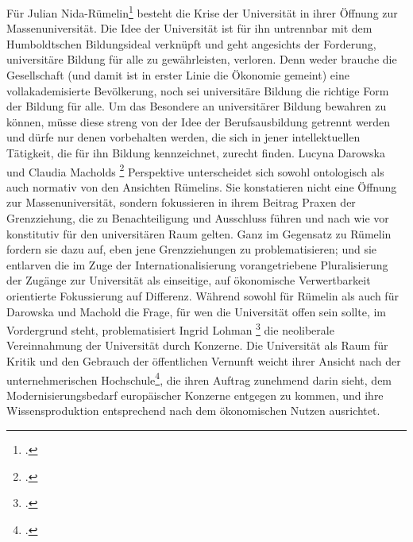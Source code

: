   Für Julian Nida-Rümelin\footnotemark \footcitetext{nida} besteht die Krise
  der Universität in ihrer Öffnung zur Massenuniversität. Die Idee der
  Universität ist für ihn untrennbar mit dem \glqq Humboldtschen Bildungsideal\grqq\footnotemark {} verknüpft und geht angesichts der
Forderung, universitäre Bildung für alle zu gewährleisten, verloren. Denn weder
brauche die Gesellschaft (und damit ist in erster Linie die Ökonomie gemeint)
eine vollakademisierte Bevölkerung, noch sei universitäre Bildung die richtige
Form der Bildung für alle. Um das Besondere an universitärer Bildung bewahren
zu können, müsse diese streng von der Idee der Berufsausbildung getrennt werden
und dürfe nur denen vorbehalten werden, die sich in jener intellektuellen
Tätigkeit, die für ihn Bildung kennzeichnet, zurecht finden. Lucyna Darowska
und Claudia Macholds \footnotemark \footcitetext{lucyna} Perspektive unterscheidet sich sowohl ontologisch als
auch normativ von den Ansichten Rümelins. Sie konstatieren nicht eine Öffnung
zur Massenuniversität, sondern fokussieren in ihrem Beitrag Praxen der
Grenzziehung, die zu Benachteiligung und Ausschluss führen und nach wie vor
konstitutiv für den universitären Raum gelten. Ganz im Gegensatz zu Rümelin
fordern sie dazu auf, eben jene Grenzziehungen zu problematisieren; und sie
entlarven die im Zuge der Internationalisierung vorangetriebene Pluralisierung
der Zugänge zur Universität als einseitige, auf ökonomische Verwertbarkeit
orientierte Fokussierung auf Differenz.  Während sowohl für Rümelin als auch
für Darowska und Machold die Frage, für wen die Universität offen sein sollte,
im Vordergrund steht, problematisiert Ingrid Lohman \footnotemark
\footcitetext{lohman} die neoliberale
Vereinnahmung der Universität durch Konzerne. Die Universität als Raum für
Kritik und den Gebrauch der öffentlichen Vernunft weicht ihrer Ansicht nach der
\glqq unternehmerischen Hochschule\grqq\footnotemark \footcitetext{lohmein}, die ihren Auftrag zunehmend darin sieht, dem
Modernisierungsbedarf europäischer Konzerne entgegen zu kommen, und ihre
Wissensproduktion entsprechend nach dem ökonomischen Nutzen ausrichtet. 

